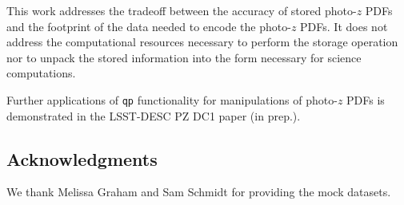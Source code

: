 \documentclass[\docopts]{\docclass}
\begin{document}

This work addresses the tradeoff between the accuracy of stored photo-$z$ PDFs and the footprint of the data needed to encode the photo-$z$ PDFs.  It does not address the computational resources necessary to perform the storage operation nor to unpack the stored information into the form necessary for science computations.

Further applications of \texttt{qp} functionality for manipulations of photo-$z$ PDFs is demonstrated in the LSST-DESC PZ DC1 paper (in prep.).

\subsection*{Acknowledgments}


We thank Melissa Graham and Sam Schmidt for providing the mock datasets.







%
\end{document}
